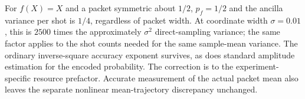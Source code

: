 For $f(X)=X$ and a packet symmetric about $1/2$, $p_f=1/2$ and the
ancilla variance per shot is $1/4$, regardless of packet width. At
coordinate width $\sigma=0.01$, this is $2500$ times the approximately
$\sigma^2$ direct-sampling variance; the same factor applies to the
shot counts needed for the same sample-mean variance. The ordinary
inverse-square accuracy exponent survives, as does standard amplitude
estimation for the encoded probability. The correction is to the
experiment-specific resource prefactor. Accurate measurement of the
actual packet mean also leaves the separate nonlinear mean-trajectory
discrepancy unchanged.

